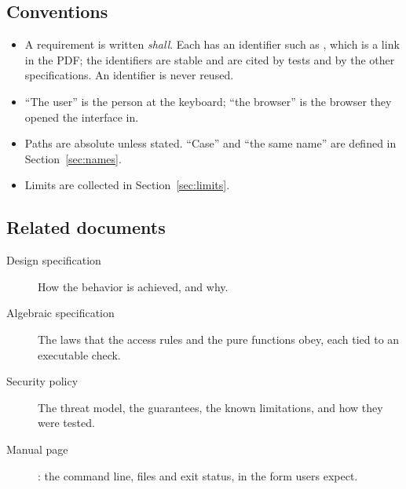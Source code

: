 \subsection{Conventions}

\begin{itemize}
  \item A requirement is written \emph{shall}.  Each has an identifier such as
        , which is a link in the PDF; the identifiers are stable and are
        cited by tests and by the other specifications.  An identifier is never
        reused.
  \item ``The user'' is the person at the keyboard; ``the browser'' is the
        browser they opened the interface in.
  \item Paths are absolute unless stated.  ``Case'' and ``the same name''
        are defined in Section~\ref{sec:names}.
  \item Limits are collected in Section~\ref{sec:limits}.
\end{itemize}

\subsection{Related documents}

\begin{description}
  \item[Design specification] How the behavior is achieved, and why.
  \item[Algebraic specification] The laws that the access rules and the pure
        functions obey, each tied to an executable check.
  \item[Security policy] The threat model, the guarantees, the known limitations,
        and how they were tested.
  \item[Manual page] : the command line, files and exit status, in the
        form users expect.
\end{description}
